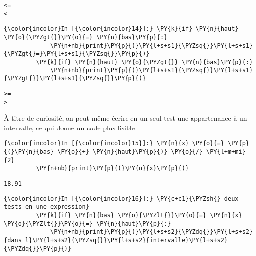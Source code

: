     \begin{Verbatim}[commandchars=\\\{\},frame=single,framerule=0.3mm,rulecolor=\color{cellframecolor}]
<=
<
\end{Verbatim}

    \begin{Verbatim}[commandchars=\\\{\},frame=single,framerule=0.3mm,rulecolor=\color{cellframecolor}]
{\color{incolor}In [{\color{incolor}14}]:} \PY{k}{if} \PY{n}{haut} \PY{o}{\PYZgt{}}\PY{o}{=} \PY{n}{bas}\PY{p}{:}
             \PY{n+nb}{print}\PY{p}{(}\PY{l+s+s1}{\PYZsq{}}\PY{l+s+s1}{\PYZgt{}=}\PY{l+s+s1}{\PYZsq{}}\PY{p}{)}
         \PY{k}{if} \PY{n}{haut} \PY{o}{\PYZgt{}} \PY{n}{bas}\PY{p}{:}
             \PY{n+nb}{print}\PY{p}{(}\PY{l+s+s1}{\PYZsq{}}\PY{l+s+s1}{\PYZgt{}}\PY{l+s+s1}{\PYZsq{}}\PY{p}{)}
\end{Verbatim}


    \begin{Verbatim}[commandchars=\\\{\},frame=single,framerule=0.3mm,rulecolor=\color{cellframecolor}]
>=
>
\end{Verbatim}

    À titre de curiosité, on peut même écrire en un seul test une
appartenance à un intervalle, ce qui donne un code plus lisible

    \begin{Verbatim}[commandchars=\\\{\},frame=single,framerule=0.3mm,rulecolor=\color{cellframecolor}]
{\color{incolor}In [{\color{incolor}15}]:} \PY{n}{x} \PY{o}{=} \PY{p}{(}\PY{n}{bas} \PY{o}{+} \PY{n}{haut}\PY{p}{)} \PY{o}{/} \PY{l+m+mi}{2}
         \PY{n+nb}{print}\PY{p}{(}\PY{n}{x}\PY{p}{)}
\end{Verbatim}


    \begin{Verbatim}[commandchars=\\\{\},frame=single,framerule=0.3mm,rulecolor=\color{cellframecolor}]
18.91
\end{Verbatim}

    \begin{Verbatim}[commandchars=\\\{\},frame=single,framerule=0.3mm,rulecolor=\color{cellframecolor}]
{\color{incolor}In [{\color{incolor}16}]:} \PY{c+c1}{\PYZsh{} deux tests en une expression}
         \PY{k}{if} \PY{n}{bas} \PY{o}{\PYZlt{}}\PY{o}{=} \PY{n}{x} \PY{o}{\PYZlt{}}\PY{o}{=} \PY{n}{haut}\PY{p}{:}
             \PY{n+nb}{print}\PY{p}{(}\PY{l+s+s2}{\PYZdq{}}\PY{l+s+s2}{dans l}\PY{l+s+s2}{\PYZsq{}}\PY{l+s+s2}{intervalle}\PY{l+s+s2}{\PYZdq{}}\PY{p}{)}
\end{Verbatim}


